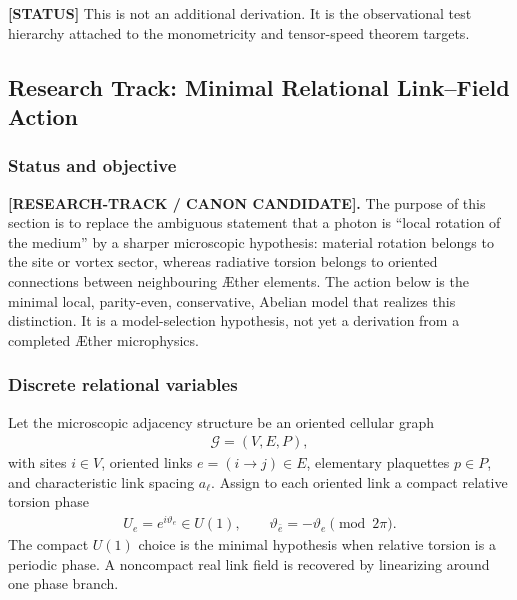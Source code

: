 \textbf{[STATUS]} This is not an additional derivation. It is the observational
test hierarchy attached to the monometricity and tensor-speed theorem targets.


\subsection{Research Track: Minimal Relational Link--Field Action}
\label{sec:rt_minimal_link_field_action}

\subsubsection{Status and objective}

\textbf{[RESEARCH-TRACK / CANON CANDIDATE].}
The purpose of this section is to replace the ambiguous statement that a photon
is ``local rotation of the medium'' by a sharper microscopic hypothesis:
material rotation belongs to the site or vortex sector, whereas radiative
torsion belongs to oriented connections between neighbouring \AE ther elements.
The action below is the minimal local, parity-even, conservative, Abelian model
that realizes this distinction.  It is a model-selection hypothesis, not yet a
derivation from a completed \AE ther microphysics.

\subsubsection{Discrete relational variables}

Let the microscopic adjacency structure be an oriented cellular graph
\begin{align}
    \mathcal G=(V,E,P),
\end{align}
with sites $i\in V$, oriented links $e=(i\!\to\!j)\in E$, elementary
plaquettes $p\in P$, and characteristic link spacing $a_\ell$.  Assign to each
oriented link a compact relative torsion phase
\begin{align}
    U_e=e^{i\vartheta_e}\in U(1),
    \qquad
    \vartheta_{\bar e}=-\vartheta_e\pmod{2\pi}.
    \label{eq:rt_link_compact_phase}
\end{align}
The compact $U(1)$ choice is the minimal hypothesis when relative torsion is a
periodic phase.  A noncompact real link field is recovered by linearizing around
one phase branch.


